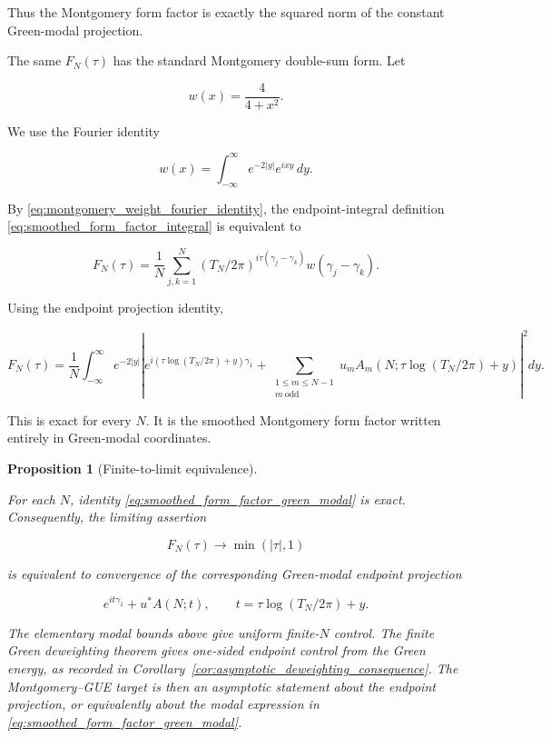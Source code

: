 \documentclass[11pt]{amsart}
\numberwithin{equation}{section}
\theoremstyle{plain}
\newtheorem{proposition}[theorem]{Proposition}
\theoremstyle{definition}
\theoremstyle{remark}
\begin{document}
Thus the Montgomery form factor is exactly the squared norm of the
constant Green-modal projection.

The same \(F_N(\tau)\) has the standard Montgomery double-sum form. Let

\begin{equation}
w(x)=\frac{4}{4+x^2}.
\label{eq:montgomery_smoothing_weight}
\end{equation}

We use the Fourier identity

\begin{equation}
w(x)
=
\int_{-\infty}^{\infty}
e^{-2|y|}e^{ixy}\,dy.
\label{eq:montgomery_weight_fourier_identity}
\end{equation}

By \eqref{eq:montgomery_weight_fourier_identity}, the endpoint-integral
definition \eqref{eq:smoothed_form_factor_integral} is equivalent to

\begin{equation}
F_N(\tau)
=
\frac1N
\sum_{j,k=1}^{N}
(T_N/2\pi)^{i\tau(\gamma_j-\gamma_k)}
w(\gamma_j-\gamma_k).
\label{eq:smoothed_montgomery_form_factor}
\end{equation}

Using the endpoint projection identity,

\begin{equation}
F_N(\tau)
=
\frac1N
\int_{-\infty}^{\infty}
e^{-2|y|}
\left|
e^{i(\tau\log(T_N/2\pi)+y)\gamma_1}
+
\sum_{\substack{1\le m\le N-1\\ m\ \mathrm{odd}}}
u_mA_m(N;\tau\log(T_N/2\pi)+y)
\right|^2
dy.
\label{eq:smoothed_form_factor_green_modal}
\end{equation}

This is exact for every \(N\). It is the smoothed Montgomery form factor
written entirely in Green-modal coordinates.

\begin{proposition}[Finite-to-limit equivalence]
\label{prop:finite_to_limit_green_modal_form_factor}

For each \(N\), identity \eqref{eq:smoothed_form_factor_green_modal} is
exact. Consequently, the limiting assertion

\begin{equation}
F_N(\tau)\to \min(|\tau|,1)
\end{equation}

is equivalent to convergence of the corresponding Green-modal endpoint
projection

\begin{equation}
e^{it\gamma_1}+u^*A(N;t),
\qquad
t=\tau\log(T_N/2\pi)+y.
\end{equation}

The elementary modal bounds above give uniform finite-\(N\) control. The
finite Green deweighting theorem gives one-sided endpoint control from
the Green energy, as recorded in
Corollary~\ref{cor:asymptotic_deweighting_consequence}. The
Montgomery--GUE target is then an asymptotic statement about the
endpoint projection, or equivalently about the modal expression in
\eqref{eq:smoothed_form_factor_green_modal}.

\end{proposition}
\end{document}
